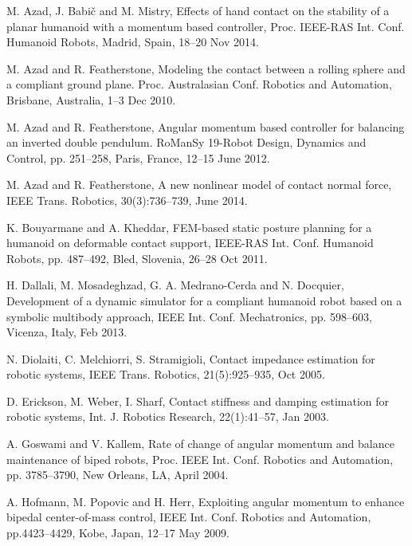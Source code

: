 \documentclass[a4paper, 11pt]{article}
\begin{document}
\begin{thebibliography}{16}

 M. Azad, J. Babi\v{c} and M. Mistry, Effects of hand
  contact on the stability of a planar humanoid with a momentum based
  controller, Proc. IEEE-RAS Int. Conf. Humanoid Robots, Madrid, Spain, 18--20
  Nov 2014.
  
 M. Azad and R. Featherstone, Modeling the
  contact between a rolling sphere and a compliant ground
  plane. Proc. Australasian Conf. Robotics and Automation, Brisbane,
  Australia, 1--3 Dec 2010.

 M. Azad and R. Featherstone, Angular momentum
  based controller for balancing an inverted double pendulum. RoManSy 19-Robot
  Design, Dynamics and Control, pp. 251--258, Paris, France, 12--15 June 2012.

 M. Azad and R. Featherstone, A new nonlinear
  model of contact normal force, IEEE Trans. Robotics, 30(3):736--739, June
  2014.

 K. Bouyarmane and A. Kheddar, FEM-based static
  posture planning for a humanoid on deformable contact support, IEEE-RAS
  Int. Conf. Humanoid Robots, pp. 487--492, Bled, Slovenia, 26--28 Oct 2011.

 H. Dallali, M. Mosadeghzad, G. A. Medrano-Cerda and
  N. Docquier, Development of a dynamic simulator for a compliant humanoid
  robot based on a symbolic multibody approach, IEEE Int. Conf. Mechatronics,
  pp. 598--603, Vicenza, Italy, Feb 2013.

 N. Diolaiti, C. Melchiorri, S. Stramigioli, Contact
  impedance estimation for robotic systems, IEEE Trans. Robotics,
  21(5):925--935, Oct 2005.

 D. Erickson, M. Weber, I. Sharf, Contact stiffness
  and damping estimation for robotic systems, Int. J. Robotics Research,
  22(1):41--57, Jan 2003.

 A. Goswami and V. Kallem, Rate of change of angular
  momentum and balance maintenance of biped robots, Proc. IEEE
  Int. Conf. Robotics and Automation, pp. 3785--3790, New Orleans, LA, April
  2004.

 A. Hofmann, M. Popovic and H. Herr, Exploiting angular
  momentum to enhance bipedal center-of-mass control, IEEE Int. Conf. Robotics
  and Automation, pp.4423--4429, Kobe, Japan, 12--17 May 2009.


\end{thebibliography}
\end{document}
